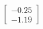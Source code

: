 \documentclass[preview]{standalone}
\begin{document}
\begin{align*}
\begin{bmatrix} -0.25 \\ -1.19 \end{bmatrix}
\end{align*}
\end{document}
